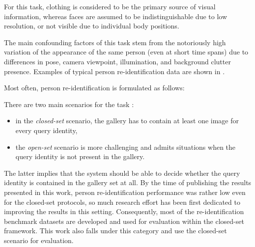 For this task, clothing is considered to be the primary source of visual information, whereas faces are assumed to be indistinguishable due to low resolution, or not visible due to individual body positions.  

The main confounding factors of this task stem from the notoriously high variation of the appearance of the same person (even at short time spans) due to differences in pose, camera viewpoint, illumination, and background clutter presence. Examples of typical person re-identification data are shown in .

Most often, person re-identification is formulated as follows:

\begin{problem}
\label{pr:identification}
\end{problem}


There are two main scenarios for the task \citep{zheng2016person}:
\begin{itemize}
\item in the \textit{closed-set} scenario, the gallery has to contain at least one image for every query identity,
\item the \textit{open-set} scenario is more challenging and admits situations when the query identity is not present in the gallery. 
\end{itemize}
The latter implies that the system should be able to decide whether the query identity is contained in the gallery set at all. 
By the time of publishing the results presented in this work, person re-identification performance was rather low even for the closed-set protocols, so much research effort has been first dedicated to improving the results in this setting. Consequently, most of the re-identification benchmark datasets are developed and used for evaluation within the closed-set framework. This work also falls under this category and use the closed-set scenario for evaluation.


